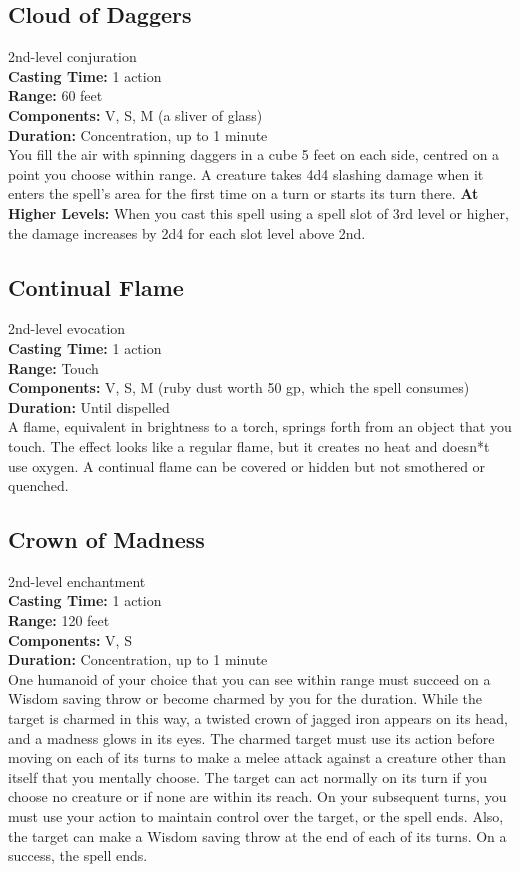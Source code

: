\documentclass[11pt, A4paper, english]{article}
\begin{document}
		\subsection{Cloud of Daggers}
2nd-level conjuration \\
\textbf{Casting Time:} 1 action \\
\textbf{Range:} 60 feet \\
\textbf{Components:} V, S, M (a sliver of glass) \\
\textbf{Duration:} Concentration, up to 1 minute \\
You fill the air with spinning daggers in a cube 5 feet on each side, centred on a point you choose within range. A creature takes 4d4 slashing damage when it enters the spell’s area for the first time on a turn or starts its turn there.
\textbf{At Higher Levels:} When you cast this spell using a spell slot of 3rd level or higher, the damage increases by 2d4 for each slot level above 2nd.

		\subsection{Continual Flame}
2nd-level evocation \\
\textbf{Casting Time:} 1 action \\
\textbf{Range:} Touch \\
\textbf{Components:} V, S, M (ruby dust worth 50 gp, which the spell consumes) \\
\textbf{Duration:} Until dispelled \\
A flame, equivalent in brightness to a torch, springs forth from an object that you touch. The effect looks like a regular flame, but it creates no heat and doesn*t use oxygen. A continual flame can be covered or hidden but not smothered or quenched.

		\subsection{Crown of Madness}
2nd-level enchantment \\
\textbf{Casting Time:} 1 action \\
\textbf{Range:} 120 feet \\
\textbf{Components:} V, S \\
\textbf{Duration:} Concentration, up to 1 minute \\
One humanoid of your choice that you can see within range must succeed on a Wisdom saving throw or become charmed by you for the duration. While the target is charmed in this way, a twisted crown of jagged iron appears on its head, and a madness glows in its eyes. The charmed target must use its action before moving on each of its turns to make a melee attack against a creature other than itself that you mentally choose. The target can act normally on its turn if you choose no creature or if none are within its reach. On your subsequent turns, you must use your action to maintain control over the target, or the spell ends. Also, the target can make a Wisdom saving throw at the end of each of its turns. On a success, the spell ends.
\end{document}
